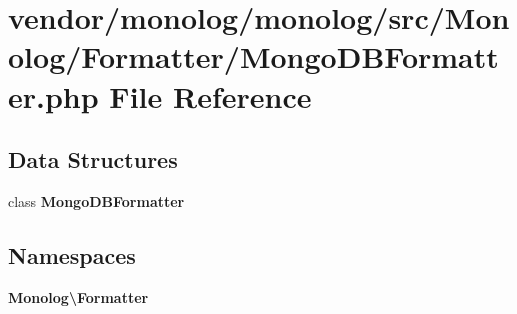 \section{vendor/monolog/monolog/src/\+Monolog/\+Formatter/\+Mongo\+D\+B\+Formatter.php File Reference}
\label{_mongo_d_b_formatter_8php}
\subsection*{Data Structures}
\begin{DoxyCompactItemize}
\item 
class {\bf Mongo\+D\+B\+Formatter}
\end{DoxyCompactItemize}
\subsection*{Namespaces}
\begin{DoxyCompactItemize}
\item 
 {\bf Monolog\textbackslash{}\+Formatter}
\end{DoxyCompactItemize}
